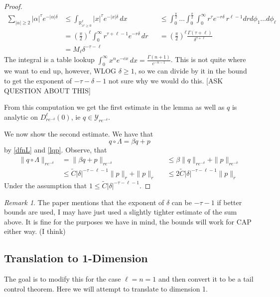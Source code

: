 \documentclass{article}
\newcommand{\R}{\mathbb{R}}
\newcommand{\Y}{\mathcal{Y}}
\theoremstyle{plain}
\theoremstyle{remark}
\newtheorem*{remark}{Remark}
\begin{document}
\begin{proof}
\begin{align*}
\sum_{|\alpha|\geq 2} |\alpha|^\tau e^{-|\alpha|\delta} & \leq \int_{\R^\ell_{x^i \geq 0}} |x|^\tau e^{-|x|\delta} \, dx && \leq \int_{0}^\frac{\pi}{2} \dots \int_{0}^\frac{\pi}{2} \int_0^\infty r^\tau e^{-r\delta}\, r^{\ell - 1} dr d\phi_1 \dots d\phi_\ell\\
& = \left(\frac{\pi}{2}\right)^\ell\int_0^\infty r^{\tau + \ell - 1} e^{-r\delta} \, dr && = \left(\frac{\pi}{2}\right)^\ell \frac{\Gamma\left(\tau+\ell\right)}{\delta^{\tau+\ell}}\\
& = M_\ell \delta^{-\tau - \ell}
\end{align*}
The integral is a table lookup $\int_0^\infty x^n e^{-cx} \, dx = \frac{\Gamma(n+1)}{c^{-n-1}}$. 
This is not quite where we want to end up, however, WLOG $\delta \geq 1$, so we can divide by it in the bound to get the exponent of $-\tau - \delta -1$ not sure why we would do this. [ASK QUESTION ABOUT THIS]

From this computation we get the first estimate in the lemma as well as $q$ is analytic on $D_{re^{-\delta}}^\ell(0)$, ie $q \in \Y_{re^{-\delta}}$. 

We now show the second estimate. 
We have that
\[ 
q \circ \Lambda = \beta q + p
\]
by \ref{dfnL} and \ref{lqp}. 
Observe, that 
\begin{align*}
\| q \circ \Lambda\|_{re^{-\delta}} & = \| \beta q + p \|_{re^{-\delta}} && \leq \beta \|q\|_{re^{-\delta}} + \|p \|_{re^{-\delta}} \\
& \leq \tilde{C}|\delta|^{-\tau-\ell-1}\|p\|_r + \|p\|_r && \leq 2 \tilde{C}|\delta|^{-\tau-\ell-1}\|p\|_r
\end{align*}
Under the assumption that $1 \leq \tilde{C}|\delta|^{-\tau-\ell-1}$. 
\end{proof}

\begin{remark}
The paper mentions that the exponent of $\delta$ can be $-\tau - 1$ if better bounds are used, I may have just used a slightly tighter estimate of the sum above. 
It is fine for the purposes we have in mind, the bounds will work for CAP either way. 
(I think)
\end{remark}

\subsection{Translation to 1-Dimension}

The goal is to modify this for the case $\ell = n = 1$ and then convert it to be a tail control theorem. 
Here we will attempt to translate to dimension 1.
\end{document}
